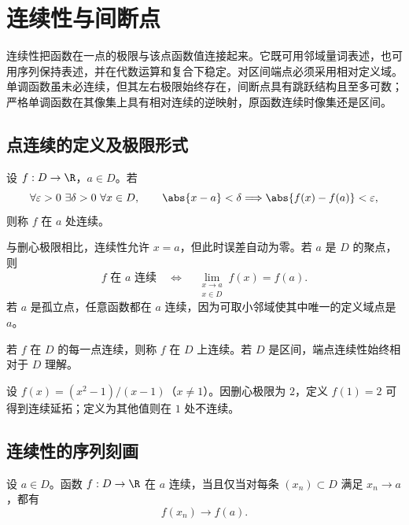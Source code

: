 \chapter{连续性与间断点}
\label{chap:continuity-discontinuity}

\begin{chapterguide}
连续性把函数在一点的极限与该点函数值连接起来。它既可用邻域量词表述，也可用序列保持表述，并在代数运算和复合下稳定。对区间端点必须采用相对定义域。单调函数虽未必连续，但其左右极限始终存在，间断点具有跳跃结构且至多可数；严格单调函数在其像集上具有相对连续的逆映射，原函数连续时像集还是区间。
\end{chapterguide}

\section{点连续的定义及极限形式}

\begin{definition}[点连续]
设 \(f:D\to\R\)，\(a\in D\)。若
\[
 \forall\varepsilon>0\ \exists\delta>0\ \forall x\in D,\qquad
 \abs{x-a}<\delta\Longrightarrow\abs{f(x)-f(a)}<\varepsilon,
\]
则称 \(f\) 在 \(a\) 处连续。
\end{definition}

与删心极限相比，连续性允许 \(x=a\)，但此时误差自动为零。若 \(a\) 是 \(D\) 的聚点，则
\[
 f\text{ 在 }a\text{ 连续}
 \quad\Longleftrightarrow\quad
 \lim_{\substack{x\to a\\x\in D}}f(x)=f(a).
\]
若 \(a\) 是孤立点，任意函数都在 \(a\) 连续，因为可取小邻域使其中唯一的定义域点是 \(a\)。

\begin{definition}[集合上的连续性]
若 \(f\) 在 \(D\) 的每一点连续，则称 \(f\) 在 \(D\) 上连续。若 \(D\) 是区间，端点连续性始终相对于 \(D\) 理解。
\end{definition}

\begin{example}[可去补值]
设 \(f(x)=(x^2-1)/(x-1)\)（\(x\ne1\)）。因删心极限为 \(2\)，定义 \(f(1)=2\) 可得到连续延拓；定义为其他值则在 \(1\) 处不连续。
\end{example}

\section{连续性的序列刻画}

\begin{theorem}[序列连续性]
设 \(a\in D\)。函数 \(f:D\to\R\) 在 \(a\) 连续，当且仅当对每条 \((x_n)\subset D\) 满足 \(x_n\to a\)，都有
\[
 f(x_n)\to f(a).
\]
\end{theorem}

